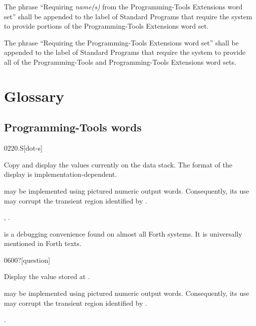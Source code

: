 The phrase ``Requiring \emph{name(s)} from the Programming-Tools
Extensions word set'' shall be appended to the label of Standard
Programs that require the system to provide portions of the
Programming-Tools Extensions word set.

The phrase ``Requiring the Programming-Tools Extensions word set''
shall be appended to the label of Standard Programs that require the
system to provide all of the Programming-Tools and Programming-Tools
Extensions word sets.



\section{Glossary} %

\subsection{Programming-Tools words} %

\begin{worddef}{0220}{.S}[dot-s]
\item \stack{}{}

	Copy and display the values currently on the data stack. The
	format of the display is implementation-dependent.

	 may be implemented using pictured numeric output words.
	Consequently, its use may corrupt the transient region identified
	by .

\see {},
	.

	\begin{rationale} %
		 is a debugging convenience found on almost
		all Forth systems. It is universally mentioned in Forth texts.
	\end{rationale}
\end{worddef}


\begin{worddef}[q]{0600}{?}[question]
\item {}

	Display the value stored at .

	 may be implemented using pictured numeric output words.
	Consequently, its use may corrupt the transient region identified
	by .

\see {}.
\end{worddef}


